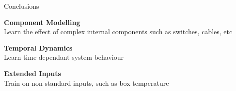 \documentclass[aspectratio=169]{beamer}
\begin{document}
\begin{frame}{\small{Conclusions}}
	\vspace{0.5cm}
	\begin{center}
		\begin{tcolorbox}[colback=blue!5!white,colframe=blue!75!black,width=0.9\textwidth]
			\textbf{Component Modelling} \\
			Learn the effect of complex internal components such as switches, cables, etc
		\end{tcolorbox}

		\vspace{0.3cm}

		\begin{tcolorbox}[colback=green!5!white,colframe=green!75!black,width=0.9\textwidth]
			\textbf{Temporal Dynamics} \\
			Learn time dependant system behaviour
		\end{tcolorbox}

		\vspace{0.3cm}

		\begin{tcolorbox}[colback=orange!5!white,colframe=orange!75!black,width=0.9\textwidth]
			\textbf{Extended Inputs} \\
			Train on non-standard inputs, such as box temperature
		\end{tcolorbox}
	\end{center}
\end{frame}
\end{document}
